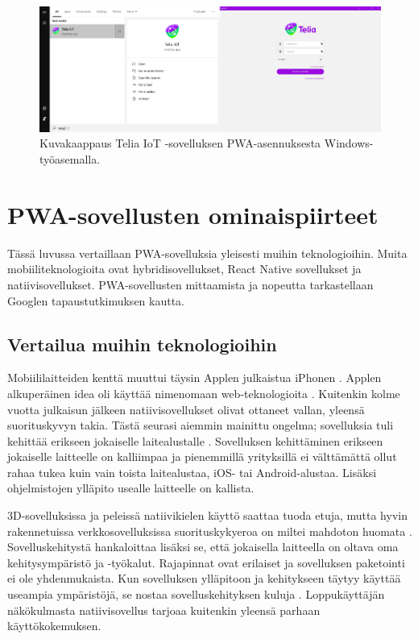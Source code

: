 \documentclass{tktltiki}
\begin{document}
\begin{figure}[h]
  \centering
      \includegraphics[width=1.0\textwidth]{teliaiot_desktop_installation1.png}
  \caption{Kuvakaappaus Telia IoT -sovelluksen PWA-asennuksesta Windows-työasemalla.}
  \label{teliaiot_windowsissa_asennettuna}
\end{figure}

\clearpage

\section{PWA-sovellusten ominaispiirteet}

Tässä luvussa vertaillaan PWA-sovelluksia yleisesti muihin teknologioihin. Muita mobiiliteknologioita ovat hybridisovellukset, React Native sovellukset ja natiivisovellukset. PWA-sovellusten mittaamista ja nopeutta tarkastellaan Googlen tapaustutkimuksen kautta. 

\subsection{Vertailua muihin teknologioihin}

Mobiililaitteiden kenttä muuttui täysin Applen julkaistua iPhonen \cite{charland2011mobile}. Applen alkuperäinen idea oli käyttää nimenomaan web-teknologioita \cite{charland2011mobile}. Kuitenkin kolme vuotta julkaisun jälkeen natiivisovellukset olivat ottaneet vallan, yleensä suorituskyvyn takia. Tästä seurasi aiemmin mainittu ongelma; sovelluksia tuli kehittää erikseen jokaiselle laitealustalle \cite{charland2011mobile}. Sovelluksen kehittäminen erikseen jokaiselle laitteelle on kalliimpaa ja pienemmillä yrityksillä ei välttämättä ollut rahaa tukea kuin vain toista laitealustaa, iOS- tai Android-alustaa. Lisäksi ohjelmistojen ylläpito usealle laitteelle on kallista.

3D-sovelluksissa ja peleissä natiivikielen käyttö saattaa tuoda etuja, mutta hyvin rakennetuissa verkkosovelluksissa suorituskykyeroa on miltei mahdoton huomata \cite{charland2011mobile}. Sovelluskehitystä hankaloittaa lisäksi se, että jokaisella laitteella on oltava oma kehitysympäristö ja -työkalut. Rajapinnat ovat erilaiset ja sovelluksen paketointi ei ole yhdenmukaista. Kun sovelluksen ylläpitoon ja kehitykseen täytyy käyttää useampia ympäristöjä, se nostaa sovelluskehityksen kuluja \cite{xanthopoulos2013comparative}. Loppukäyttäjän näkökulmasta natiivisovellus tarjoaa kuitenkin yleensä parhaan käyttökokemuksen.
\end{document}
